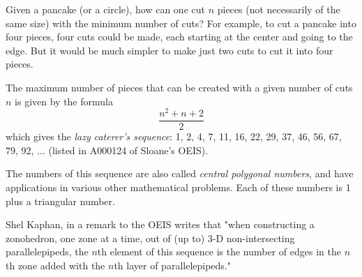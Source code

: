 \documentclass[12pt]{article}
\begin{document}
Given a pancake (or a circle), how can one cut $n$ pieces (not necessarily of the same size) with the minimum number of cuts? For example, to cut a pancake into four pieces, four cuts could be made, each starting at the center and going to the edge. But it would be much simpler to make just two cuts to cut it into four pieces.

The maximum number of pieces that can be created with a given number of cuts $n$ is given by the formula $$\frac{n^2 + n + 2}{2}$$ which gives the \emph{lazy caterer's sequence}: 1, 2, 4, 7, 11, 16, 22, 29, 37, 46, 56, 67, 79, 92, ... (listed in A000124 of Sloane's OEIS).

The numbers of this sequence are also called \emph{central polygonal numbers}, and have applications in various other mathematical problems. Each of these numbers is 1 plus a triangular number.

Shel Kaphan, in a remark to the OEIS writes that "when constructing a zonohedron, one zone at a time, out of (up to) 3-D non-intersecting parallelepipeds, the $n$th element of this sequence is the number of edges in the $n$th zone added with the $n$th layer of parallelepipeds."
\end{document}
